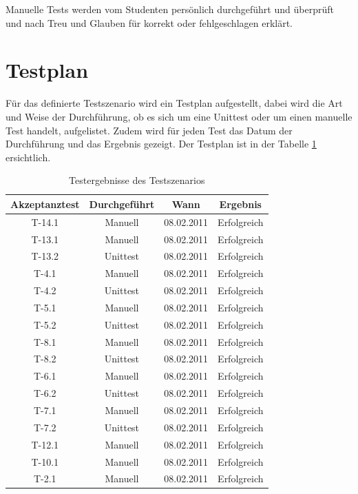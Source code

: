 \documentclass[abstracton, listof=totocnumbered,
bibliography=totocnumbered]{scrreprt}
\begin{document}
  Manuelle Tests werden vom Studenten persönlich durchgeführt und überprüft und
  nach Treu und Glauben für korrekt oder fehlgeschlagen erklärt.
  
  \section{Testplan}
  
  Für das definierte Testszenario wird ein Testplan aufgestellt, dabei wird die
  Art und Weise der Durchführung, ob es sich um eine Unittest oder um einen
  manuelle Test handelt, aufgelistet. Zudem wird für jeden Test das Datum der
  Durchführung und das Ergebnis gezeigt. Der Testplan ist in der Tabelle
  \ref{tab:testergebnisse} ersichtlich.
  \newline

  \enlargethispage{3cm}

  \begin{table}[h]
    \begin{center}
      \begin{tabular}{cccc}
        \toprule
        Akzeptanztest & Durchgeführt & Wann & Ergebnis \\
        \midrule
        T-14.1 & Manuell & 08.02.2011 & Erfolgreich \\
        T-13.1 & Manuell & 08.02.2011 & Erfolgreich \\
        T-13.2 & Unittest & 08.02.2011 & Erfolgreich \\
        T-4.1 & Manuell & 08.02.2011 & Erfolgreich \\
        T-4.2 & Unittest & 08.02.2011 & Erfolgreich \\
        T-5.1 & Manuell & 08.02.2011 & Erfolgreich \\
        T-5.2 & Unittest & 08.02.2011 & Erfolgreich \\
        T-8.1 & Manuell & 08.02.2011 & Erfolgreich \\
        T-8.2 & Unittest & 08.02.2011 & Erfolgreich \\
        T-6.1 & Manuell & 08.02.2011 & Erfolgreich \\
        T-6.2 & Unittest & 08.02.2011 & Erfolgreich \\
        T-7.1 & Manuell & 08.02.2011 & Erfolgreich \\
        T-7.2 & Unittest & 08.02.2011 & Erfolgreich \\
        T-12.1 & Manuell & 08.02.2011 & Erfolgreich \\
        T-10.1 & Manuell & 08.02.2011 & Erfolgreich \\
        T-2.1 & Manuell & 08.02.2011 & Erfolgreich \\
        \bottomrule
      \end{tabular}
      \caption{Testergebnisse des Testszenarios}
      \label{tab:testergebnisse}
     \end{center}  
  \end{table}
  
\end{document}
